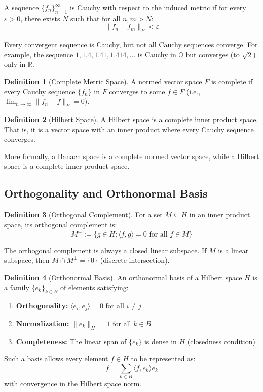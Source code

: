 \documentclass[12pt,a4paper]{article}
\theoremstyle{definition}
\newtheorem{definition}{Definition}[section]
\begin{document}
A sequence $\{f_n\}_{n=1}^{\infty}$ is Cauchy with respect to the induced metric if for every $\varepsilon > 0$, there exists $N$ such that for all $n, m > N$:
\[
\|f_n - f_m\|_F < \varepsilon
\]

Every convergent sequence is Cauchy, but not all Cauchy sequences converge. For example, the sequence $1, 1.4, 1.41, 1.414, \ldots$ is Cauchy in $\mathbb{Q}$ but converges (to $\sqrt{2}$) only in $\mathbb{R}$.

\begin{definition}[Complete Metric Space]
A normed vector space $F$ is complete if every Cauchy sequence $\{f_n\}$ in $F$ converges to some $f \in F$ (i.e., $\lim_{n \to \infty} \|f_n - f\|_F = 0$).
\end{definition}

\begin{definition}[Hilbert Space]
A Hilbert space is a complete inner product space. That is, it is a vector space with an inner product where every Cauchy sequence converges.

More formally, a Banach space is a complete normed vector space, while a Hilbert space is a complete inner product space.
\end{definition}

\subsection{Orthogonality and Orthonormal Basis}

\begin{definition}[Orthogonal Complement]
For a set $M \subseteq H$ in an inner product space, its orthogonal complement is:
\[
M^{\perp} := \{g \in H : \langle f, g \rangle = 0 \text{ for all } f \in M\}
\]

The orthogonal complement is always a closed linear subspace. If $M$ is a linear subspace, then $M \cap M^{\perp} = \{0\}$ (discrete intersection).
\end{definition}

\begin{definition}[Orthonormal Basis]
An orthonormal basis of a Hilbert space $H$ is a family $\{e_k\}_{k \in B}$ of elements satisfying:

\begin{enumerate}
    \item \textbf{Orthogonality:} $\langle e_i, e_j \rangle = 0$ for all $i \neq j$
    \item \textbf{Normalization:} $\|e_k\|_H = 1$ for all $k \in B$
    \item \textbf{Completeness:} The linear span of $\{e_k\}$ is dense in $H$ (closedness condition)
\end{enumerate}

Such a basis allows every element $f \in H$ to be represented as:
\[
f = \sum_{k \in B} \langle f, e_k \rangle e_k
\]
with convergence in the Hilbert space norm.
\end{definition}
\end{document}
